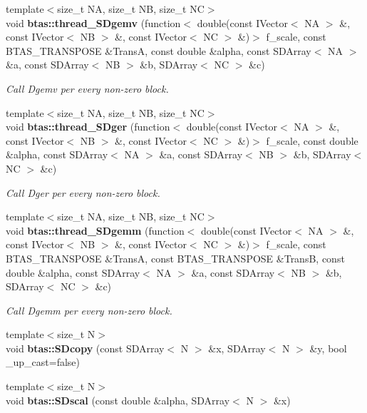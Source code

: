 \begin{DoxyCompactItemize}
{\footnotesize template$<$size\-\_\-t N\-A, size\-\_\-t N\-B, size\-\_\-t N\-C$>$ }\\void {\bf btas\-::thread\-\_\-\-S\-Dgemv} (function$<$ double(const I\-Vector$<$ N\-A $>$ \&, const I\-Vector$<$ N\-B $>$ \&, const I\-Vector$<$ N\-C $>$ \&)$>$ f\-\_\-scale, const B\-T\-A\-S\-\_\-\-T\-R\-A\-N\-S\-P\-O\-S\-E \&Trans\-A, const double \&alpha, const S\-D\-Array$<$ N\-A $>$ \&a, const S\-D\-Array$<$ N\-B $>$ \&b, S\-D\-Array$<$ N\-C $>$ \&c)
\begin{DoxyCompactList}\small\item\em Call Dgemv per every non-\/zero block. \end{DoxyCompactList}\item 
{\footnotesize template$<$size\-\_\-t N\-A, size\-\_\-t N\-B, size\-\_\-t N\-C$>$ }\\void {\bf btas\-::thread\-\_\-\-S\-Dger} (function$<$ double(const I\-Vector$<$ N\-A $>$ \&, const I\-Vector$<$ N\-B $>$ \&, const I\-Vector$<$ N\-C $>$ \&)$>$ f\-\_\-scale, const double \&alpha, const S\-D\-Array$<$ N\-A $>$ \&a, const S\-D\-Array$<$ N\-B $>$ \&b, S\-D\-Array$<$ N\-C $>$ \&c)
\begin{DoxyCompactList}\small\item\em Call Dger per every non-\/zero block. \end{DoxyCompactList}\item 
{\footnotesize template$<$size\-\_\-t N\-A, size\-\_\-t N\-B, size\-\_\-t N\-C$>$ }\\void {\bf btas\-::thread\-\_\-\-S\-Dgemm} (function$<$ double(const I\-Vector$<$ N\-A $>$ \&, const I\-Vector$<$ N\-B $>$ \&, const I\-Vector$<$ N\-C $>$ \&)$>$ f\-\_\-scale, const B\-T\-A\-S\-\_\-\-T\-R\-A\-N\-S\-P\-O\-S\-E \&Trans\-A, const B\-T\-A\-S\-\_\-\-T\-R\-A\-N\-S\-P\-O\-S\-E \&Trans\-B, const double \&alpha, const S\-D\-Array$<$ N\-A $>$ \&a, const S\-D\-Array$<$ N\-B $>$ \&b, S\-D\-Array$<$ N\-C $>$ \&c)
\begin{DoxyCompactList}\small\item\em Call Dgemm per every non-\/zero block. \end{DoxyCompactList}\item 
{\footnotesize template$<$size\-\_\-t N$>$ }\\void {\bf btas\-::\-S\-Dcopy} (const S\-D\-Array$<$ N $>$ \&x, S\-D\-Array$<$ N $>$ \&y, bool \-\_\-up\-\_\-cast=false)
\item 
{\footnotesize template$<$size\-\_\-t N$>$ }\\void {\bf btas\-::\-S\-Dscal} (const double \&alpha, S\-D\-Array$<$ N $>$ \&x)

\end{DoxyCompactItemize}
